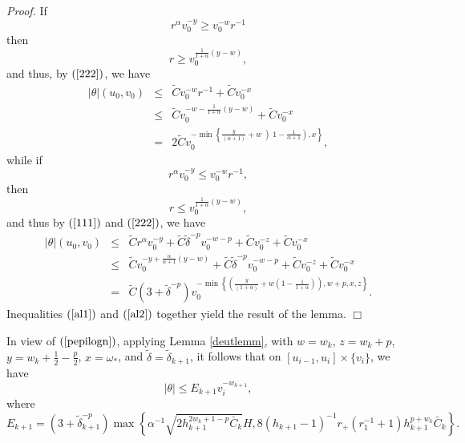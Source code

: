 \documentclass{article}
\begin{document}
\noindent\emph{Proof.}
If 
\[
r^\alpha v_0^{-y}\ge v_0^{-w}r^{-1}
\]
then 
\[
r\ge v_0^{\frac{1}{1+\alpha}\left(y-w\right)},
\]
and thus, by
$(\ref{222})$, we have
\begin{eqnarray}
\label{al1}
\nonumber
|\theta|(u_0,v_0)	&\le&	\tilde{C}v_0^{-w}r^{-1}+\tilde{C}v_0^{-x}\\
\nonumber	
		&\le&	\tilde{C}v_0^{-w-\frac{1}{1+\alpha}
					\left(y-w\right)}+\tilde{C}v_0^{-x}\\
		& = &	2\tilde{C}v_0^{-\min\left\{\frac{y}{(\alpha+1)}+
					w\left)1-\frac1{\alpha+1}\right),x\right\}},
\end{eqnarray}
while
if 
\[
r^\alpha v_0^{-y}\le v_0^{-w}r^{-1},
\]
then
\[
r\le v_0^{\frac{1}{1+\alpha}\left(y-w\right)},
\]
and thus by
$(\ref{111})$ and $(\ref{222})$, we have
\begin{eqnarray}
\label{al2}
\nonumber
|\theta|(u_0,v_0)	&\le& 	
\tilde{C}r^\alpha v_0^{-y}+\tilde{C}\tilde{\delta}^{-p}v_0^{-w-p}+
					\tilde{C}v_0^{-z}+\tilde{C}v_0^{-x}\\
\nonumber
		&\le&	\tilde{C}v_0^{-y+\frac{\alpha}{\alpha+1}
					\left(y-w\right)}+\tilde{C}\tilde{\delta}^{-p}v_0^{-w-p}+
						\tilde{C}v_0^{-z}+\tilde{C}v_0^{-x}\\
		& = &	\tilde{C}(3+\tilde{\delta}^{-p})
				v_0^{-\min\left\{\left(\frac{y}{(1+\alpha)}
					+w\left(1-\frac{1}{1+\alpha}\right)\right),
					w+p,x,z\right\}}.
\end{eqnarray}
Inequalities
$(\ref{al1})$ and $(\ref{al2})$ together yield the result of the lemma. $\Box$

In view of $(\ref{pepilogn})$, 
applying Lemma \ref{deutlemm}, with $w=w_k$, $z=w_k+p$, $y=w_k+\frac12-\frac p2$,
$x=\omega_*$, and $\tilde{\delta}=\tilde{\delta}_{k+1}$,
it follows that on $[u_{i-1},u_i]\times \{v_i\}$, we have
\[
|\theta|\le E_{k+1}v_i^{-w_{k+1}},
\]
where
\[
E_{k+1}=(3+\tilde{\delta}_{k+1}^{-p})
\max\left\{\alpha^{-1}
\sqrt{2h_{k+1}^{2w_k+1-p}\bar{C}_k}H,
8(h_{k+1}-1)^{-1}r_+(r_1^{-1}+1)h_{k+1}^{p+w_k}\bar{C}_k
\right\}.
\]
\end{document}
